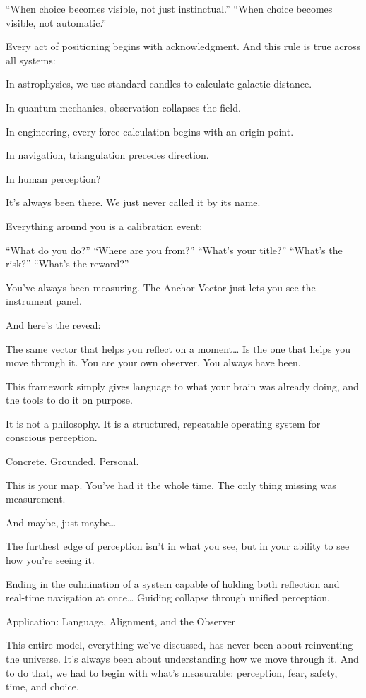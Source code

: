 \documentclass[11pt]{article}
\begin{document}
“When choice becomes visible, not just instinctual.” 
“When choice becomes visible, not automatic.”

Every act of positioning begins with acknowledgment. And this rule is true across all systems:

In astrophysics, we use standard candles to calculate galactic distance.

In quantum mechanics, observation collapses the field.

In engineering, every force calculation begins with an origin point.

In navigation, triangulation precedes direction.

In human perception?

It’s always been there.
We just never called it by its name.

Everything around you is a calibration event:

“What do you do?”
“Where are you from?”
“What’s your title?”
“What’s the risk?”
“What’s the reward?”

You’ve always been measuring.
The Anchor Vector just lets you see the instrument panel.

And here’s the reveal:

The same vector that helps you reflect on a moment…
Is the one that helps you move through it.
You are your own observer.
You always have been.

This framework simply gives language to what your brain was already doing, and the tools to do it on purpose.

It is not a philosophy.
It is a structured, repeatable operating system for conscious perception.

Concrete. Grounded. Personal.

This is your map.
You’ve had it the whole time.
The only thing missing was measurement.

And maybe, just maybe…

The furthest edge of perception isn’t in what you see,
but in your ability to see how you’re seeing it.

Ending in the culmination of a system capable of holding both reflection and real-time navigation at once…
Guiding collapse through unified perception.

Application: Language, Alignment, and the Observer

This entire model, everything we’ve discussed, has never been about reinventing the universe. It’s always been about understanding how we move through it. And to do that, we had to begin with what’s measurable: perception, fear, safety, time, and choice.
\end{document}
